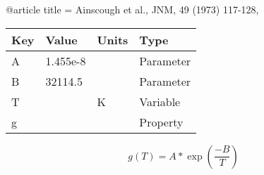 @article{
title = {Ainscough et al., JNM, 49 (1973) 117-128},
}

\begin{tabular}{|l|l|l|l|}
    \hline
    Key & Value & Units & Type \\
    \hline
    A & 1.455e-8 &  & Parameter\\
    B & 32114.5 &  & Parameter \\
    T &   & K    & Variable\\
    g &   &  & Property\\
    \hline
\end{tabular}

\begin{equation}
g(T)=A*\exp(\frac{-B}{T})
\end{equation}


